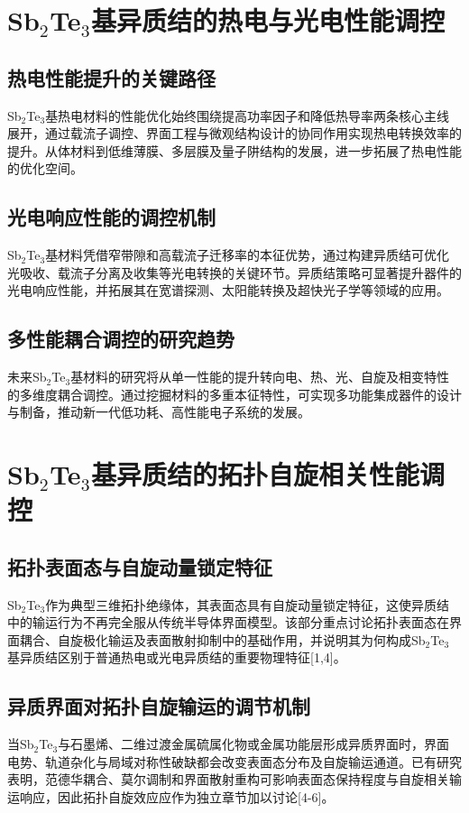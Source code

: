 \documentclass[12pt,a4paper]{ctexart}
\begin{document}
\section{\texorpdfstring{Sb$_2$Te$_3$}{Sb2Te3}基异质结的热电与光电性能调控}

\subsection{热电性能提升的关键路径}
Sb$_2$Te$_3$基热电材料的性能优化始终围绕提高功率因子和降低热导率两条核心主线展开，通过载流子调控、界面工程与微观结构设计的协同作用实现热电转换效率的提升。从体材料到低维薄膜、多层膜及量子阱结构的发展，进一步拓展了热电性能的优化空间。

\subsection{光电响应性能的调控机制}
Sb$_2$Te$_3$基材料凭借窄带隙和高载流子迁移率的本征优势，通过构建异质结可优化光吸收、载流子分离及收集等光电转换的关键环节。异质结策略可显著提升器件的光电响应性能，并拓展其在宽谱探测、太阳能转换及超快光子学等领域的应用。

\subsection{多性能耦合调控的研究趋势}
未来Sb$_2$Te$_3$基材料的研究将从单一性能的提升转向电、热、光、自旋及相变特性的多维度耦合调控。通过挖掘材料的多重本征特性，可实现多功能集成器件的设计与制备，推动新一代低功耗、高性能电子系统的发展。

\section{\texorpdfstring{Sb$_2$Te$_3$}{Sb2Te3}基异质结的拓扑自旋相关性能调控}

\subsection{拓扑表面态与自旋动量锁定特征}
Sb$_2$Te$_3$作为典型三维拓扑绝缘体，其表面态具有自旋动量锁定特征，这使异质结中的输运行为不再完全服从传统半导体界面模型。该部分重点讨论拓扑表面态在界面耦合、自旋极化输运及表面散射抑制中的基础作用，并说明其为何构成Sb$_2$Te$_3$基异质结区别于普通热电或光电异质结的重要物理特征[1,4]。

\subsection{异质界面对拓扑自旋输运的调节机制}
当Sb$_2$Te$_3$与石墨烯、二维过渡金属硫属化物或金属功能层形成异质界面时，界面电势、轨道杂化与局域对称性破缺都会改变表面态分布及自旋输运通道。已有研究表明，范德华耦合、莫尔调制和界面散射重构可影响表面态保持程度与自旋相关输运响应，因此拓扑自旋效应应作为独立章节加以讨论[4-6]。
\end{document}
